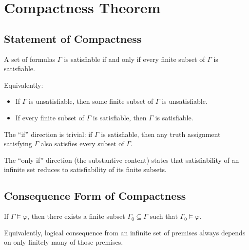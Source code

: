 
\section{Compactness Theorem}

\subsection{Statement of Compactness}

\begin{theorem}
A set of formulas $\Gamma$ is satisfiable if and only if every finite subset of
$\Gamma$ is satisfiable.

Equivalently:
\begin{itemize}
  \item If $\Gamma$ is unsatisfiable, then some finite subset of $\Gamma$ is
        unsatisfiable.
  \item If every finite subset of $\Gamma$ is satisfiable, then $\Gamma$ is
        satisfiable.
\end{itemize}
\end{theorem}

\begin{remark}
The ``if'' direction is trivial: if $\Gamma$ is satisfiable, then any truth
assignment satisfying $\Gamma$ also satisfies every subset of $\Gamma$.

The ``only if'' direction (the substantive content) states that satisfiability
of an infinite set reduces to satisfiability of its finite subsets.
\end{remark}

\subsection{Consequence Form of Compactness}

\begin{corollary}
If $\Gamma \models \varphi$, then there exists a finite subset
$\Gamma_0 \subseteq \Gamma$ such that $\Gamma_0 \models \varphi$.

Equivalently, logical consequence from an infinite set of premises always
depends on only finitely many of those premises.
\end{corollary}



